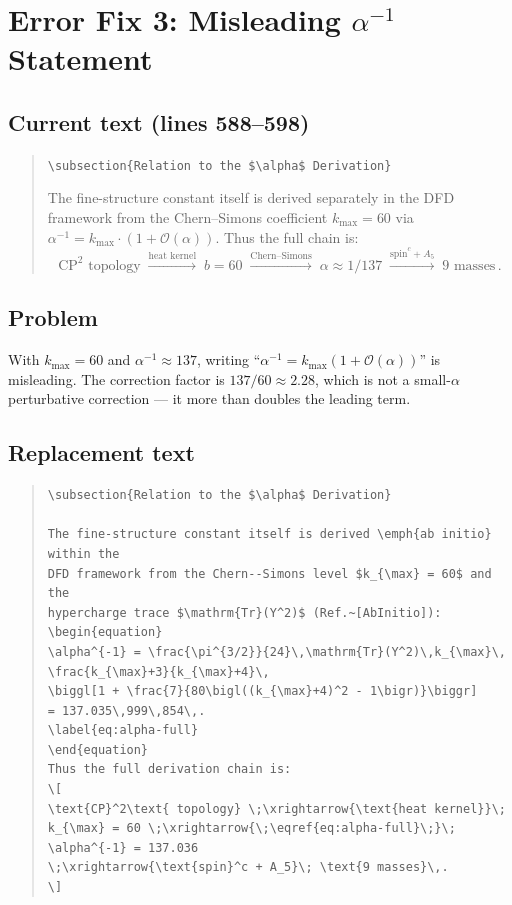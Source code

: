 \documentclass[11pt]{article}
\begin{document}
\section*{Error Fix 3: Misleading $\alpha^{-1}$ Statement}

\subsection*{Current text (lines 588--598)}

\begin{quote}
\verb|\subsection{Relation to the $\alpha$ Derivation}|

The fine-structure constant itself is derived separately in the DFD framework
from the Chern--Simons coefficient $k_{\max} = 60$ via
$\alpha^{-1} = k_{\max}\cdot(1 + \mathcal{O}(\alpha))$.  Thus the full chain
is:
\[
\text{CP}^2\text{ topology} \;\xrightarrow{\text{heat kernel}}\; b = 60
\;\xrightarrow{\text{Chern--Simons}}\; \alpha \approx 1/137
\;\xrightarrow{\text{spin}^c + A_5}\; \text{9 masses}\,.
\]
\end{quote}

\subsection*{Problem}

With $k_{\max} = 60$ and $\alpha^{-1} \approx 137$, writing
``$\alpha^{-1} = k_{\max}(1 + \mathcal{O}(\alpha))$'' is misleading.
The correction factor is $137/60 \approx 2.28$, which is not a small-$\alpha$
perturbative correction --- it more than doubles the leading term.

\subsection*{Replacement text}

\begin{quote}
\begin{verbatim}
\subsection{Relation to the $\alpha$ Derivation}

The fine-structure constant itself is derived \emph{ab initio} within the
DFD framework from the Chern--Simons level $k_{\max} = 60$ and the
hypercharge trace $\mathrm{Tr}(Y^2)$ (Ref.~[AbInitio]):
\begin{equation}
\alpha^{-1} = \frac{\pi^{3/2}}{24}\,\mathrm{Tr}(Y^2)\,k_{\max}\,
\frac{k_{\max}+3}{k_{\max}+4}\,
\biggl[1 + \frac{7}{80\bigl((k_{\max}+4)^2 - 1\bigr)}\biggr]
= 137.035\,999\,854\,.
\label{eq:alpha-full}
\end{equation}
Thus the full derivation chain is:
\[
\text{CP}^2\text{ topology} \;\xrightarrow{\text{heat kernel}}\;
k_{\max} = 60 \;\xrightarrow{\;\eqref{eq:alpha-full}\;}\;
\alpha^{-1} = 137.036
\;\xrightarrow{\text{spin}^c + A_5}\; \text{9 masses}\,.
\]
\end{verbatim}
\end{quote}
\end{document}
